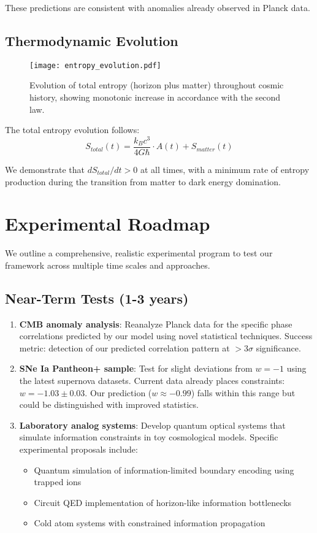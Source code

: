 \documentclass[12pt]{article}
\theoremstyle{plain}
\theoremstyle{definition}
\theoremstyle{remark}
\begin{document}
These predictions are consistent with anomalies already observed in Planck data.

\subsection{Thermodynamic Evolution}

\begin{figure}
\centering
\texttt{[image: entropy\_evolution.pdf]}
\caption{Evolution of total entropy (horizon plus matter) throughout cosmic history, showing monotonic increase in accordance with the second law.}
\end{figure}

The total entropy evolution follows:
\begin{equation}
S_{total}(t) = \frac{k_B c^3}{4G\hbar} \cdot A(t) + S_{matter}(t)
\end{equation}

We demonstrate that $dS_{total}/dt > 0$ at all times, with a minimum rate of entropy production during the transition from matter to dark energy domination.

\section{Experimental Roadmap}

We outline a comprehensive, realistic experimental program to test our framework across multiple time scales and approaches.

\subsection{Near-Term Tests (1-3 years)}

\begin{enumerate}
\item \textbf{CMB anomaly analysis}: Reanalyze Planck data for the specific phase correlations predicted by our model using novel statistical techniques. Success metric: detection of our predicted correlation pattern at $>$3$\sigma$ significance.

\item \textbf{SNe Ia Pantheon+ sample}: Test for slight deviations from $w = -1$ using the latest supernova datasets. Current data already places constraints: $w = -1.03 \pm 0.03$. Our prediction ($w \approx -0.99$) falls within this range but could be distinguished with improved statistics.

\item \textbf{Laboratory analog systems}: Develop quantum optical systems that simulate information constraints in toy cosmological models. Specific experimental proposals include:
   \begin{itemize}
   \item Quantum simulation of information-limited boundary encoding using trapped ions
   \item Circuit QED implementation of horizon-like information bottlenecks
   \item Cold atom systems with constrained information propagation
   \end{itemize}
\end{enumerate}
\end{document}
